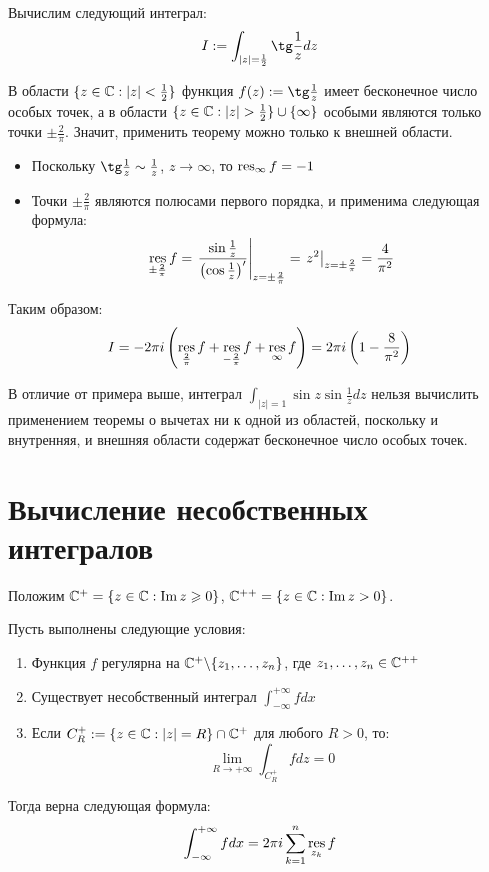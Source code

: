 \begin{example}
	Вычислим следующий интеграл:
	\[I := \int_{|z| = \frac12} \tg\frac1z dz\]
	
	В области $\{z \in \mathbb{C}: |z| < \frac12\}$ функция $f(z) := \tg\frac1z$ имеет бесконечное число особых точек, а в области $\{z \in \mathbb{C}: |z| > \frac12\} \cup \{\infty\}$ особыми являются только точки $\pm \frac2\pi$. Значит, применить теорему можно только к внешней области.
	\begin{itemize}
		\item Поскольку $\tg\frac1z \sim \frac1z$, $z \to \infty$, то $\operatorname*{res}_\infty{f} = -1$
		
		\item Точки $\pm\frac2\pi$ являются полюсами первого порядка, и применима следующая формула:
		\[\operatorname*{res}_{\pm\frac2\pi}{f} = \left.\frac{\sin\frac1z}{\left(\cos\frac1z\right)'}\right|_{z = \pm\frac2\pi} = \left.z^2\right|_{z = \pm\frac2\pi} = \frac4{\pi^2}\]
	\end{itemize}
	
	Таким образом:
	\[I = -2\pi i\left(\operatorname*{res}_{\frac2\pi}f + \operatorname*{res}_{-\frac2\pi}f + \operatorname*{res}_{\infty}f\right) = 2\pi i\left(1 - \frac8{\pi^2}\right)\]
\end{example}

\begin{note}
	В отличие от примера выше, интеграл $\int_{|z| = 1}\sin{z}\sin\frac1zdz$ нельзя вычислить применением теоремы о вычетах ни к одной из областей, поскольку и внутренняя, и внешняя области содержат бесконечное число особых точек.
\end{note}

\section{Вычисление несобственных интегралов}

Положим $\mathbb{C}^+ = \{z \in \mathbb{C}: \operatorname{Im} z \geqslant 0\}$, $\mathbb{C}^{++} = \{z \in \mathbb{C}: \operatorname{Im} z > 0\}$.

\begin{proposition}[лемма <<$+$>>]
	Пусть выполнены следующие условия:
	\begin{enumerate}
		\item Функция $f$ регулярна на $\mathbb{C}^+ \backslash \{z_1, \dotsc, z_n\}$, где $z_1, \dotsc, z_n \in \mathbb{C}^{++}$
		\item Существует несобственный интеграл $\int_{-\infty}^{+\infty}fdx$
		\item Если $C_R^+ := \{z \in \mathbb{C}: |z| = R\} \cap \mathbb{C}^+$ для любого $R > 0$, то:
		\[\lim_{R\to +\infty} \int_{C_R^+}fdz = 0\]
	\end{enumerate}
	
	Тогда верна следующая формула:
	\[\int_{-\infty}^{+\infty}fdx = 2\pi i\sum_{k = 1}^n\operatorname*{res}_{z_k}{f}\]
\end{proposition}


